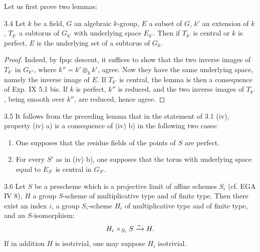 Let us first prove two lemmas:
\begin{lemma}{3.4}\label{XV.3.4}
Let $k$ be a field, $G$ an algebraic $k$-group, $E$ a subset of $G$, $k'$ an extension of $k$, $T_{k'}$ a subtorus of $G_{k'}$ with underlying space $E_{k'}$. Then if $T_{k'}$ is central or $k$ is perfect, $E$ is the underlying set of a subtorus of $G_k$.
\end{lemma}
\begin{proof}
Indeed, by fpqc descent, it suffices to show that the two inverse images of $T_{k'}$ in $G_{k''}$, where $k''=k'\otimes_k k'$, agree. Now they have the same underlying space, namely the inverse image of $E$. If $T_{k'}$ is central, the lemma is then a consequence of Exp. IX 5.1 bis. If $k$ is perfect, $k''$ is reduced, and the two inverse images of $T_{k'}$, being smooth over $k''$, are reduced, hence agree.
\end{proof}
\begin{remark}{3.5}\label{XV.3.5}
It follows from the preceding lemma that in the statement of 3.1 (iv), property (iv) a) is a consequence of (iv) b) in the following two cases:
\begin{enumerate}[label=\textup{(\arabic*)}]
\item One supposes that the residue fields of the points of $S$ are perfect.
\item For every $S'$ as in (iv) b), one supposes that the torus with underlying space equal to $E_{S'}$ is central in $G_{S'}$.
\end{enumerate}
\end{remark}
\begin{lemma}{3.6}\label{XV.3.6}
Let $S$ be a prescheme which is a projective limit of affine schemes $S_i$ (cf. EGA IV 8), $H$ a group $S$-scheme of multiplicative type and of finite type. Then there exist an index $i$, a group $S_i$-scheme $H_i$ of multiplicative type and of finite type, and an $S$-isomorphism:
\[
H_i\times_{S_i}S\xrightarrow{\sim} H.
\]
If in addition $H$ is isotrivial, one may suppose $H_i$ isotrivial.
\end{lemma}
